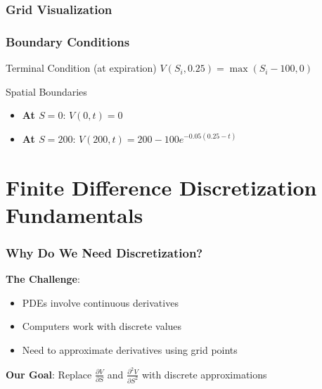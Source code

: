 \documentclass[aspectratio=169]{beamer}
\begin{document}
\begin{frame}
\frametitle{Grid Visualization}
\begin{center}
\end{center}
\end{frame}

\begin{frame}
\frametitle{Boundary Conditions}
\begin{block}{Terminal Condition (at expiration)}
$V(S_i, 0.25) = \max(S_i - 100, 0)$
\end{block}

\begin{block}{Spatial Boundaries}
\begin{itemize}
\item \textbf{At $S = 0$}: $V(0, t) = 0$
\item \textbf{At $S = 200$}: $V(200, t) = 200 - 100e^{-0.05(0.25-t)}$
\end{itemize}
\end{block}
\end{frame}

\section{Finite Difference Discretization Fundamentals}

\begin{frame}
\frametitle{Why Do We Need Discretization?}
\textbf{The Challenge}:
\begin{itemize}
\item PDEs involve continuous derivatives
\item Computers work with discrete values
\item Need to approximate derivatives using grid points
\end{itemize}

\textbf{Our Goal}:
Replace $\frac{\partial V}{\partial S}$ and $\frac{\partial^2 V}{\partial S^2}$ with discrete approximations
\end{frame}
\end{document}
